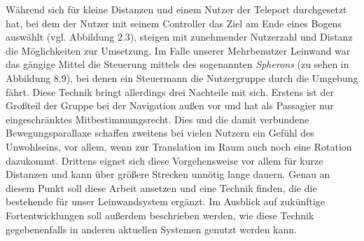 Während sich für kleine Distanzen und einem Nutzer der Teleport durchgesetzt hat, bei dem der Nutzer mit seinem Controller das Ziel am Ende eines Bogens auswählt (vgl. Abbildung 2.3), steigen mit zunehmender Nutzerzahl und Distanz die Möglichkeiten zur Umsetzung.
Im Falle unserer Mehrbenutzer Leinwand war das gängige Mittel die Steuerung mittels des sogenannten \textit{Spherons} (zu sehen in Abbildung 8.9), bei denen ein Steuermann die Nutzergruppe durch die Umgebung \glqq fährt\grqq{}.
Diese Technik bringt allerdings drei Nachteile mit sich. Erstens ist der Großteil der Gruppe bei der Navigation außen vor und hat als Passagier nur eingeschränktes Mitbestimmungsrecht. Dies und die damit verbundene Bewegungsparallaxe schaffen zweitens bei vielen Nutzern ein Gefühl des Unwohlseins, vor allem, wenn zur Translation im Raum auch noch eine Rotation dazukommt. Drittens eignet sich diese Vorgehensweise vor allem für kurze Distanzen und kann über größere Strecken unnötig lange dauern.
Genau an diesem Punkt soll diese Arbeit ansetzen und eine Technik finden, die die bestehende für unser Leinwandsystem ergänzt. Im Ausblick auf zukünftige Fortentwicklungen soll außerdem beschrieben werden, wie diese Technik gegebenenfalls in anderen aktuellen Systemen genutzt werden kann.